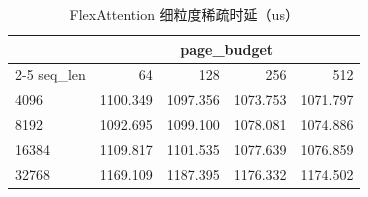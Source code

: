 \begin{table}[hbt]
\small
\centering
\caption{FlexAttention 细粒度稀疏时延（us）}
\label{table:eval-sparsity-flexattention}
\begin{tabular}{@{}lrrrr@{}}
\toprule
\multicolumn{1}{c}{} & \multicolumn{4}{c}{page\_budget} \\
\cmidrule(l){2-5}
seq\_len & 64 & 128 & 256 & 512 \\
\midrule
4096  & 1100.349 & 1097.356 & 1073.753 & 1071.797 \\
8192  & 1092.695 & 1099.100 & 1078.081 & 1074.886 \\
16384 & 1109.817 & 1101.535 & 1077.639 & 1076.859 \\
32768 & 1169.109 & 1187.395 & 1176.332 & 1174.502 \\
\bottomrule
\end{tabular}
\end{table}
